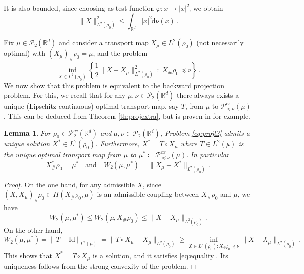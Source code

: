 \documentclass[12pt]{amsart}
\def\ed{\mathrm{d}}
\def\mc#1{\mathcal{#1}}
\newtheorem{lemma}{Lemma}
\begin{document}
It is also bounded, since choosing as test function $\varphi : x \rightarrow |x|^2$, we obtain
\[
\|X\|^2_{L^2(\rho_0)} \leq \int_{\mathbb{R}^d}|x|^2 \ed \nu(x)\,.
\]

Fix $\mu \in \mc{P}_2 (\mathbb{R}^d)$ and consider a transport map $X_\mu \in L^2(\rho_0)$ (not necessarily optimal) with $(X_\mu)_\# \rho_0 = \mu$, and the problem
\begin{equation}\label{eq:projl2}
\inf_{X\in L^2(\rho_0)} \left\{ \frac{1}{2}\|X - X_\mu \|^2_{ L^2(\rho_0)} \; :\; X_\# \rho_0  \preceq \nu \right\}\,.
\end{equation}
We now show that this problem is equivalent to the backward projection problem. For this, we recall that for any $\mu,\nu \in \mc{P}_2(\mathbb{R}^d)$ there always exists a unique (Lipschitz continuous) optimal transport map, say $T$,  from $\mu$ to $\mathscr{P}^{cx}_{\preceq \nu}(\mu)$. This can be deduced from Theorem \ref{th:projextra}, but is proven in \cite{alfonsi2020sampling,gozlan2020mixture} for example.





\begin{lemma}\label{lem:lift} 
{For  $\rho_0 \in \mc{P}_2^{ac}(\mathbb{R}^d)$ and $\mu, \nu  \in \mc{P}_2(\mathbb{R}^d)$,}
Problem \eqref{eq:projl2} admits a unique solution $X^*\in L^2(\rho_0)$. Furthermore, $X^* = T\circ X_\mu$ where $T\in L^2(\mu)$ is the unique optimal transport map from $\mu$ to $\mu^* \coloneqq \mathscr{P}_{\preceq \nu}^{cx}(\mu)$. In particular
\begin{equation}\label{eq:equality}
X^*_\# \rho_0 =  \mu^* \quad \text{and} \quad W_2(\mu,\mu^*) = \|X_\mu - X^*\|_{L^2(\rho_0)}\,. 
\end{equation}
\end{lemma}
\begin{proof} 
On the one hand, for any admissible $X$, since $(X,X_\mu)_\# \rho_0\in \Pi(X_\#\rho_0,\mu)$ is an admissible coupling between $X_\# \rho_0$ and $\mu$,  we have
\[
W_2(\mu,\mu^*) \leq W_2(\mu, X_\# \rho_0) \leq \|X - X_\mu\|_{L^2(\rho_0)}.
\]
On the other hand,
\[
    W_2(\mu,\mu^*)  = \|T-\mathrm{Id}\|_{L^2(\mu)} = \|T \circ X_\mu-X_\mu \|_{L^2(\rho_0)}\geq \inf_{X \in L^2(\rho_0) : X_\#\rho_0 \preceq \nu}\|X - X_\mu\|_{L^2(\rho_0)}\,.
\]
This shows that $X^* = T\circ X_\mu$ is a solution, and it satisfies \eqref{eq:equality}. Its uniqueness follows from the strong convexity of the problem.
\end{proof}
\end{document}
